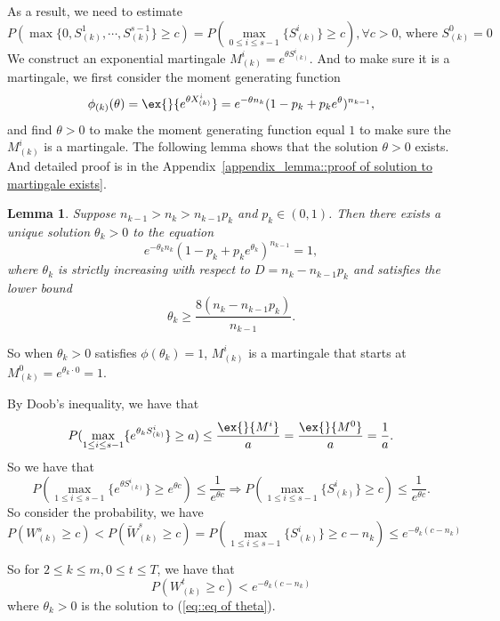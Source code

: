 \documentclass[preprint]{article}
\theoremstyle{plain}
\newtheorem{lemma}[theorem]{Lemma}
\theoremstyle{definition}
\theoremstyle{remark}
\begin{document}
As a result, we need to estimate 
$$P\left( \max\{0,S^1_{(k)},\cdots,S^{s-1}_{(k)}\} \ge c\right)=P\left( \max_{0\leq i\leq s-1}\{S^i_{(k)}\} \ge c\right), \forall c>0 ,\,\text{where }S^0_{(k)}=0$$
We construct an exponential martingale $M^i_{(k)} = e^{\theta S^i_{(k)}}$. And to make sure it is a martingale, we first consider the moment generating function
$$\phi_{(k)}(\theta) = \ex{}{e^{\theta X_{(k)}^i}}= e^{-\theta n_{k}}(1-p_k+p_ke^{\theta})^{n_{k-1}},$$
and find $\theta>0$ to make the moment generating function equal $1$ to make sure the $M^i_{(k)}$ is a martingale. The following lemma shows that the solution $\theta>0$ exists. And detailed proof is in the Appendix~\ref{appendix_lemma::proof of solution to martingale exists}.
\begin{lemma}\label{lemma::solution to martingale exists}
Suppose \(n_{k-1} > n_k > n_{k-1} p_k\) and \(p_k \in (0, 1)\). Then there exists a unique solution \(\theta_k > 0\) to the equation
\begin{equation}
    e^{-\theta_k n_k} (1 - p_k + p_k e^{\theta_k})^{n_{k-1}} = 1, \label{eq::eq of theta}
\end{equation}
where \(\theta_k\) is strictly increasing with respect to \(D = n_k - n_{k-1} p_k\) and satisfies the lower bound
\[
\theta_k \geq \frac{8 (n_k - n_{k-1} p_k)}{n_{k-1}}.
\]
\end{lemma}
So when $\theta_k>0$ satisfies $\phi(\theta_k)=1$, $M^i_{(k)}$ is a martingale that starts at $M^0_{(k)}= e^{\theta_k \cdot 0}=1 $.

By Doob's inequality, we have that
$$P(\max_{1\leq i
\leq s-1}\{ e^{\theta_k S^i_{(k)}} \}\geq a)\leq \frac{\ex{}{M^i}}{a} = \frac{\ex{}{M^0}}{a}= \frac{1}{a}.$$
So we have that
$$P(\max_{1\leq i
\leq s-1}\{ e^{\theta S^i_{(k)}}\} \geq e^{\theta c})\leq \frac{1}{e^{\theta c}}  \Rightarrow P(\max_{1\leq i
\leq s-1}\{  S^i_{(k)}\} \geq c)\leq \frac{1}{e^{\theta c}} .$$
So consider the probability, we have 
$$P\left(  W^s_{(k)}\geq c  \right) <P\left(  \tilde{W}^s_{(k)}\geq c  \right) = P(\max_{1\leq i
\leq s-1}\{  S^i_{(k)}\} \geq c - n_k)\leq e^{-\theta_k (c - n_k)}$$

So for $2\leq k\leq m, 0\leq t\leq T$, we have that
$$P\left(  W^t_{(k)}\geq c  \right)< e^{-\theta_k (c - n_k)}$$
where $\theta_k>0$ is the solution to (\ref{eq::eq of theta}).
\end{document}
